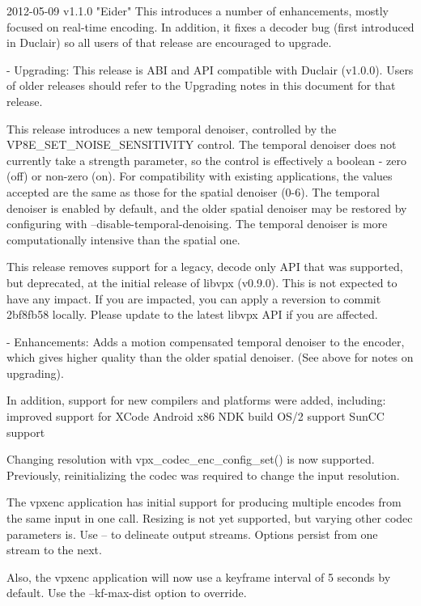 \begin{DoxyVerbInclude}
2012-05-09 v1.1.0 "Eider"
  This introduces a number of enhancements, mostly focused on real-time
  encoding. In addition, it fixes a decoder bug (first introduced in
  Duclair) so all users of that release are encouraged to upgrade.

  - Upgrading:
    This release is ABI and API compatible with Duclair (v1.0.0). Users
    of older releases should refer to the Upgrading notes in this
    document for that release.

    This release introduces a new temporal denoiser, controlled by the
    VP8E_SET_NOISE_SENSITIVITY control. The temporal denoiser does not
    currently take a strength parameter, so the control is effectively
    a boolean - zero (off) or non-zero (on). For compatibility with
    existing applications, the values accepted are the same as those
    for the spatial denoiser (0-6). The temporal denoiser is enabled
    by default, and the older spatial denoiser may be restored by
    configuring with --disable-temporal-denoising. The temporal denoiser
    is more computationally intensive than the spatial one.

    This release removes support for a legacy, decode only API that was
    supported, but deprecated, at the initial release of libvpx
    (v0.9.0). This is not expected to have any impact. If you are
    impacted, you can apply a reversion to commit 2bf8fb58 locally.
    Please update to the latest libvpx API if you are affected.

  - Enhancements:
      Adds a motion compensated temporal denoiser to the encoder, which
      gives higher quality than the older spatial denoiser. (See above
      for notes on upgrading).

      In addition, support for new compilers and platforms were added,
      including:
        improved support for XCode
        Android x86 NDK build
        OS/2 support
        SunCC support

      Changing resolution with vpx_codec_enc_config_set() is now
      supported. Previously, reinitializing the codec was required to
      change the input resolution.

      The vpxenc application has initial support for producing multiple
      encodes from the same input in one call. Resizing is not yet
      supported, but varying other codec parameters is. Use -- to
      delineate output streams. Options persist from one stream to the
      next.

      Also, the vpxenc application will now use a keyframe interval of
      5 seconds by default. Use the --kf-max-dist option to override.


\end{DoxyVerbInclude}
